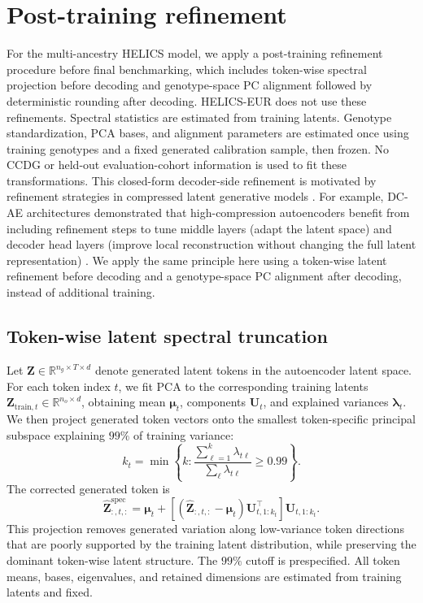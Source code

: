 \documentclass{article}
\begin{document}
\section{Post-training refinement}
\label{app:post_generation_refinement}

For the multi-ancestry HELICS model, we apply a post-training refinement procedure before final benchmarking, which includes token-wise spectral projection before decoding and genotype-space PC alignment followed by deterministic rounding after decoding. HELICS-EUR does not use these refinements. Spectral statistics are estimated from training latents. Genotype standardization, PCA bases, and alignment parameters are estimated once using training genotypes and a fixed generated calibration sample, then frozen. No CCDG or held-out evaluation-cohort information is used to fit these transformations. This closed-form decoder-side refinement is motivated by refinement strategies in compressed latent generative models \cite{chen2024deep, yu2024image, chen2025masked}. For example, DC-AE architectures demonstrated that high-compression autoencoders benefit from including refinement steps to tune middle layers (adapt the latent space) and decoder head layers (improve local reconstruction without changing the full latent representation) \cite{chen2024deep}. We apply the same principle here using a token-wise latent refinement before decoding and a genotype-space PC alignment after decoding, instead of additional training.

\subsection{Token-wise latent spectral truncation}
\label{sec:app-spectralTrunc}
Let \(\widehat{\boldsymbol Z}\in\mathbb R^{n_g\times T\times d}\) denote generated latent tokens in the autoencoder latent space. For each token index \(t\), we fit PCA to the corresponding training latents \(\boldsymbol Z_{\mathrm{train},t}\in\mathbb R^{n_o\times d}\), obtaining mean \(\boldsymbol\mu_t\), components \(\boldsymbol U_t\), and explained variances \(\boldsymbol\lambda_t\). We then project generated token vectors onto the smallest token-specific principal subspace explaining \(99\%\) of training variance:
\[
k_t
=
\min\left\{
k:
\frac{\sum_{\ell=1}^{k}\lambda_{t\ell}}
{\sum_{\ell}\lambda_{t\ell}}
\ge 0.99
\right\}.
\]
The corrected generated token is
\[
\widehat{\boldsymbol Z}^{\mathrm{spec}}_{:,t,:}
=
\boldsymbol\mu_t
+
\left[
(\widehat{\boldsymbol Z}_{:,t,:}-\boldsymbol\mu_t)
\boldsymbol U_{t,1:k_t}^{\top}
\right]
\boldsymbol U_{t,1:k_t}.
\]
This projection removes generated variation along low-variance token directions that are poorly supported by the training latent distribution, while preserving the dominant token-wise latent structure. The \(99\%\) cutoff is prespecified. All token means, bases, eigenvalues, and retained dimensions are estimated from training latents and fixed.
\end{document}
